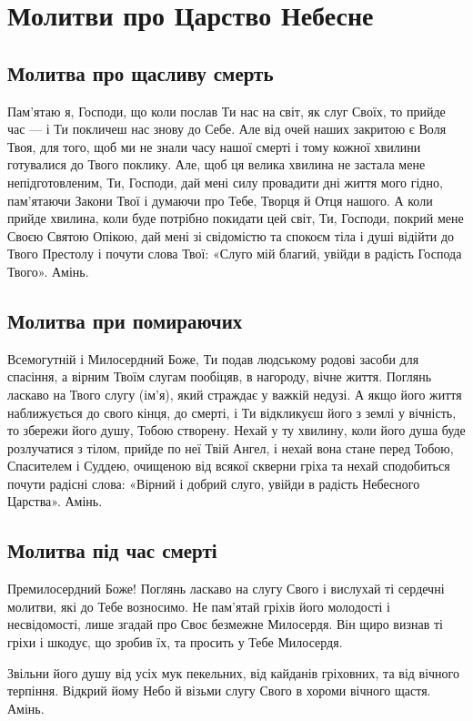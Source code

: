 \documentclass[chapters.tex]{subfiles}
\begin{document}
\chapter{Молитви про Царство Небесне}
\section{Молитва про щасливу смерть}
Пам’ятаю я, Господи, що коли послав Ти нас на світ, як слуг Своїх, то прийде час — і Ти покличеш нас знову до Себе. Але від очей наших закритою є Воля Твоя, для того, щоб ми не знали часу нашої смерті і тому кожної хвилини готувалися до Твого поклику. Але, щоб ця велика хвилина не застала мене непідготовленим, Ти, Господи, дай мені силу провадити дні життя мого гідно, пам’ятаючи Закони Твої і думаючи про Тебе, Творця й Отця нашого. А коли прийде хвилина, коли буде потрібно покидати цей світ, Ти, Господи, покрий мене Своєю Святою Опікою, дай мені зі свідомістю та спокоєм тіла і душі відійти до Твого Престолу і почути слова Твої: «Слуго мій благий, увійди в радість Господа Твого». Амінь.

\section{Молитва при помираючих}
Всемогутній і Милосердний Боже, Ти подав людському родові засоби для спасіння, а вірним Твоїм слугам пообіцяв, в нагороду, вічне життя. Поглянь ласкаво на Твого слугу (ім’я), який страждає у важкій недузі. А якщо його життя наближується до свого кінця, до смерті, і Ти відкликуєш його з землі у вічність, то збережи його душу, Тобою створену. Нехай у ту хвилину, коли його душа буде розлучатися з тілом, прийде по неї Твій Ангел, і нехай вона стане перед Тобою, Спасителем і Суддею, очищеною від всякої скверни гріха та нехай сподобиться почути радісні слова: «Вірний і добрий слуго, увійди в радість Небесного Царства». Амінь.

\section{Молитва під час смерті}
Премилосердний Боже! Поглянь ласкаво на слугу Свого і вислухай ті сердечні молитви, які до Тебе возносимо. Не пам’ятай гріхів його молодості і несвідомості, лише згадай про Своє безмежне Милосердя. Він щиро визнав ті гріхи і шкодує, що зробив їх, та просить у Тебе Милосердя.

Звільни його душу від усіх мук пекельних, від кайданів гріховних, та від вічного терпіння. Відкрий йому Небо й візьми слугу Свого в хороми вічного щастя. Амінь.
\end{document}
